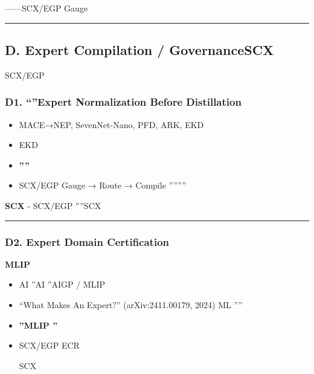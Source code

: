 \documentclass[
  12pt,
]{article}
\providecommand{\tightlist}{%
  \setlength{\itemsep}{0pt}\setlength{\parskip}{0pt}}
\begin{document}
\textbf{}------SCX/EGP
 Gauge \textbf{}

\begin{center}\rule{0.5\linewidth}{0.5pt}\end{center}

\subsection{D. Expert Compilation / GovernanceSCX
}\label{d.-expert-compilation-governancescx-ux6838ux5fc3ux521bux65b0ux533a}

 SCX/EGP
\textbf{}

\subsubsection{D1. ``''Expert Normalization Before
Distillation}\label{d1.-ux84b8ux998fux524dux7684ux4e13ux5bb6ux89c4ux8303ux5316expert-normalization-before-distillation}

\textbf{}

\begin{itemize}
\tightlist
\item
  MACE→NEP, SevenNet-Nano, PFD, ARK, EKD
  
\item
  
  EKD
\item
  \textbf{''''}
\item
  SCX/EGP  Gauge → Route → Compile
  ''''''''
\end{itemize}

\textbf{SCX } -  SCX/EGP
''''SCX


\begin{center}\rule{0.5\linewidth}{0.5pt}\end{center}

\subsubsection{D2. Expert Domain
Certification}\label{d2.-expert-domain-certification}

\textbf{ MLIP }

\begin{itemize}
\tightlist
\item
   AI ''AI ''AIGP
  / MLIP 
\item
  ``What Makes An Expert?'' (arXiv:2411.00179, 2024) 
  ML ''''
\item
  \textbf{''MLIP ''}
\item
  SCX/EGP  ECR
  
  SCX 
\end{itemize}
\end{document}

